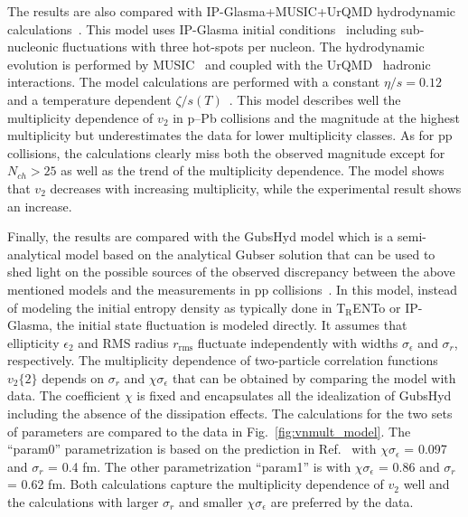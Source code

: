 The results are also compared with IP-Glasma+MUSIC+UrQMD hydrodynamic calculations~\cite{Schenke:2020mbo}. This model uses IP-Glasma initial conditions~\cite{Schenke:2012wb} including sub-nucleonic fluctuations with three hot-spots per nucleon. The hydrodynamic evolution is performed by MUSIC~\cite{Schenke:2010rr} and coupled with the UrQMD~\cite{Bass:1998ca,Bleicher:1999xi} hadronic interactions. 
The model calculations are performed with a constant $\eta/s=0.12$ and a temperature dependent $\zeta/s(T)$~\cite{Rose:2020lfc}. 
This model describes well the multiplicity dependence of $v_2$ in p--Pb collisions and the magnitude at the highest multiplicity but underestimates the data for lower multiplicity classes. As for pp collisions, the calculations clearly miss both the observed magnitude except for $N_{ch}>25$ as well as the trend of the multiplicity dependence. The model shows that $v_2$ decreases with increasing multiplicity, while the experimental result shows an increase.

Finally, the results are compared with the GubsHyd model which is a semi-analytical model based on the analytical Gubser solution that can be used to shed light on the possible sources of the observed discrepancy between the above mentioned models and the measurements in pp collisions~\cite{Taghavi:2019mqz}. In this model, instead of modeling the initial entropy density as typically done in T$_{\text{R}}$ENTo or IP-Glasma, the initial state fluctuation is modeled directly. It assumes that ellipticity $\epsilon_{2}$ and RMS radius $r_{\text{rms}}$ fluctuate independently with widths $\sigma_{\epsilon}$
 and $\sigma_{r}$, respectively. The multiplicity dependence of two-particle correlation functions $v_2\{2\}$ depends on $\sigma_{r}$ and  $\chi\sigma_{\epsilon}$ that can be obtained by comparing the model with data. The coefficient $\chi$ is fixed and encapsulates all the idealization of GubsHyd including the absence of the dissipation effects. The calculations for the two sets of parameters are compared
to the data in Fig.~\ref{fig:vnmult_model}. The “param0” parametrization is based on the prediction in Ref.~\cite{Taghavi:2019mqz} with $\chi \sigma_{\epsilon}$ = 0.097 and $\sigma_{r}$ = 0.4 fm. The other parametrization “param1” is with $\chi \sigma_{\epsilon}$ = 0.86 and $\sigma_{r}$ = 0.62 fm. Both calculations capture the multiplicity dependence of $v_2$ well and the calculations with larger $\sigma_{r}$ and smaller $\chi \sigma_{\epsilon}$ are preferred by the data.
 
